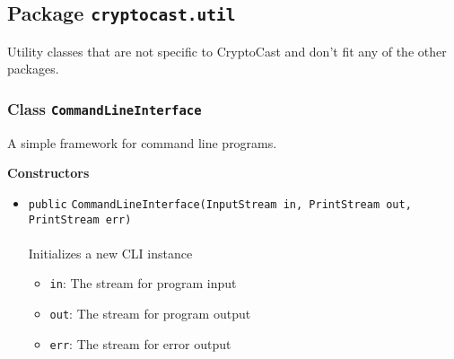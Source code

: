 \subsection{Package \lstinline!cryptocast.util!}
Utility classes that are not specific to CryptoCast and don't fit any of the other packages.

\subsubsection{Class \lstinline|CommandLineInterface|}
A simple framework for command line programs. \\
\noindent\begin{minipage}[t]{5cm}
\vspace{0.3em}
\hspace*{2em}
\vspace{0.3em}
\end{minipage}




\textbf{\sffamily Constructors}
\begin{itemize}
\item \lstinline|public| \lstinline|CommandLineInterface|\lstinline|(InputStream in, PrintStream out, PrintStream err)|\\ \\[-0.6em]
Initializes a new CLI instance
\begin{itemize}
\item \lstinline|in|: The stream for program input
\item \lstinline|out|: The stream for program output
\item \lstinline|err|: The stream for error output
\end{itemize}



\end{itemize}


